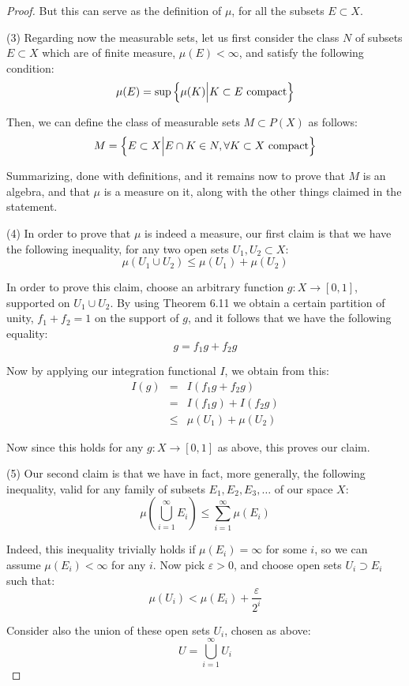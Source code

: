 \documentclass[12pt]{amsbook}
\begin{document}
\begin{proof}
But this can serve as the definition of $\mu$, for all the subsets $E\subset X$.

\medskip

(3) Regarding now the measurable sets, let us first consider the class $N$ of subsets $E\subset X$ which are of finite measure, $\mu(E)<\infty$, and satisfy the following condition:
$$\mu(E)=\sup\left\{\mu(K)\Big| K\subset E\ {\rm compact}\right\}$$

Then, we can define the class of measurable sets $M\subset P(X)$ as follows:
$$M=\left\{E\subset X\Big|E\cap K\in N,\forall K\subset X\ {\rm compact}\right\}$$

Summarizing, done with definitions, and it remains now to prove that $M$ is an algebra, and that $\mu$ is a measure on it, along with the other things claimed in the statement.

\medskip

(4) In order to prove that $\mu$ is indeed a measure, our first claim is that we have the following inequality, for any two open sets $U_1,U_2\subset X$:
$$\mu(U_1\cup U_2)\leq\mu(U_1)+\mu(U_2)$$ 

In order to prove this claim, choose an arbitrary function $g:X\to[0,1]$, supported on $U_1\cup U_2$. By using Theorem 6.11 we obtain a certain partition of unity, $f_1+f_2=1$ on the support of $g$, and it follows that we have the following equality:
$$g=f_1g+f_2g$$

Now by applying our integration functional $I$, we obtain from this:
\begin{eqnarray*}
I(g)
&=&I(f_1g+f_2g)\\
&=&I(f_1g)+I(f_2g)\\
&\leq&\mu(U_1)+\mu(U_2)
\end{eqnarray*}

Now since this holds for any $g:X\to[0,1]$ as above, this proves our claim.

\medskip

(5) Our second claim is that we have in fact, more generally, the following inequality, valid for any family of subsets $E_1,E_2,E_3,\ldots$ of our space $X$:
$$\mu\left(\bigcup_{i=1}^\infty E_i\right)\leq\sum_{i=1}^\infty\mu(E_i)$$

Indeed, this inequality trivially holds if $\mu(E_i)=\infty$ for some $i$, so we can assume $\mu(E_i)<\infty$ for any $i$. Now pick $\varepsilon>0$, and choose open sets $U_i\supset E_i$ such that:
$$\mu(U_i)<\mu(E_i)+\frac{\varepsilon}{2^i}$$

Consider also the union of these open sets $U_i$, chosen as above:
$$U=\bigcup_{i=1}^\infty U_i$$


\end{proof}
\end{document}
